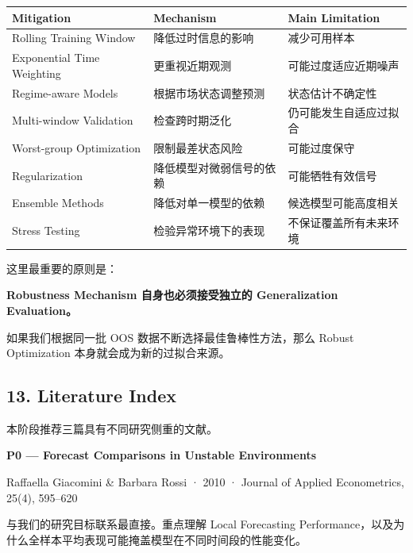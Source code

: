 \begin{readertable}
\begin{longtable}[]{@{}
  >{\raggedright\arraybackslash}p{}
  >{\raggedright\arraybackslash}p{}
  >{\raggedright\arraybackslash}p{}@{}}
\toprule
Mitigation & Mechanism & Main Limitation \\
\midrule
\endhead
Rolling Training Window & 降低过时信息的影响 & 减少可用样本 \\
Exponential Time Weighting & 更重视近期观测 & 可能过度适应近期噪声 \\
Regime-aware Models & 根据市场状态调整预测 & 状态估计不确定性 \\
Multi-window Validation & 检查跨时期泛化 & 仍可能发生自适应过拟合 \\
Worst-group Optimization & 限制最差状态风险 & 可能过度保守 \\
Regularization & 降低模型对微弱信号的依赖 & 可能牺牲有效信号 \\
Ensemble Methods & 降低对单一模型的依赖 & 候选模型可能高度相关 \\
Stress Testing & 检验异常环境下的表现 & 不保证覆盖所有未来环境 \\
\bottomrule
\end{longtable}
\end{readertable}

这里最重要的原则是：

\textbf{Robustness Mechanism 自身也必须接受独立的 Generalization Evaluation。}

如果我们根据同一批 OOS 数据不断选择最佳鲁棒性方法，那么 Robust Optimization 本身就会成为新的过拟合来源。

\hypertarget{part-4-77-0001-literature-index}{%
\subsection{13. Literature Index}\label{part-4-77-0001-literature-index}}

本阶段推荐三篇具有不同研究侧重的文献。

\textbf{P0 --- Forecast Comparisons in Unstable Environments}

Raffaella Giacomini \& Barbara Rossi · 2010 · Journal of Applied Econometrics, 25(4), 595--620

与我们的研究目标联系最直接。重点理解 Local Forecasting Performance，以及为什么全样本平均表现可能掩盖模型在不同时间段的性能变化。

